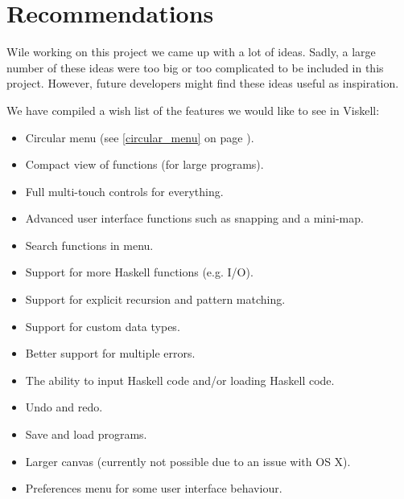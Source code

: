\chapter{Recommendations}

Wile working on this project we came up with a lot of ideas.
Sadly, a large number of these ideas were too big or too complicated to be included in this project.
However, future developers might find these ideas useful as inspiration.

We have compiled a wish list of the features we would like to see in Viskell:

\begin{itemize}
	\item Circular menu (see \ref{circular_menu} on page \pageref{circular_menu}).
	\item Compact view of functions (for large programs).
	\item Full multi-touch controls for everything.
	\item Advanced user interface functions such as snapping and a mini-map.
	\item Search functions in menu.
	\item Support for more Haskell functions (e.g. I/O).
	\item Support for explicit recursion and pattern matching.
	\item Support for custom data types.
	\item Better support for multiple errors.
	\item The ability to input Haskell code and/or loading Haskell code.
	\item Undo and redo.
	\item Save and load programs.
	\item Larger canvas (currently not possible due to an issue with OS X).
	\item Preferences menu for some user interface behaviour.
\end{itemize}
